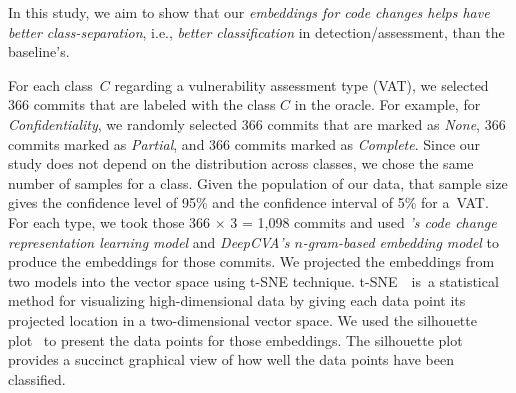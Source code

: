 



In this study, we aim to show that our {\em embeddings for code
changes helps {\tool} have better class-separation}, i.e., {\em better
classification} in detection/assessment, than the baseline's.


For each class~$C$ regarding a vulnerability assessment type (VAT), we
selected 366 commits that are labeled with the class $C$ in the
oracle. For example, for {\em Confidentiality}, we randomly selected
366 commits that are marked as {\em None}, 366 commits marked as {\em
Partial}, and 366 commits marked as {\em Complete}. Since our study
does not depend on the distribution across classes, we chose the same
number of samples for a class. Given the population of our data, that
sample size gives the confidence level of 95\% and the confidence
interval of 5\% for a~VAT.
%
For each type, we took those 366 $\times$ 3 = 1,098 commits and used
{\em {\tool}'s code change representation learning model} and {\em DeepCVA's
$n$-gram-based embedding model} to produce the embeddings for
those commits.  We projected the embeddings from two models
into the vector space using t-SNE technique. t-SNE~\cite{tsne}~is~a
statistical method for visualizing high-dimensional data by giving
each data point its projected location in a two-dimensional vector
space. We used the silhouette plot~\cite{silhouette-plot} to
present the data points for those embeddings. The silhouette plot
provides a succinct graphical view of how well the data points have
been classified.

